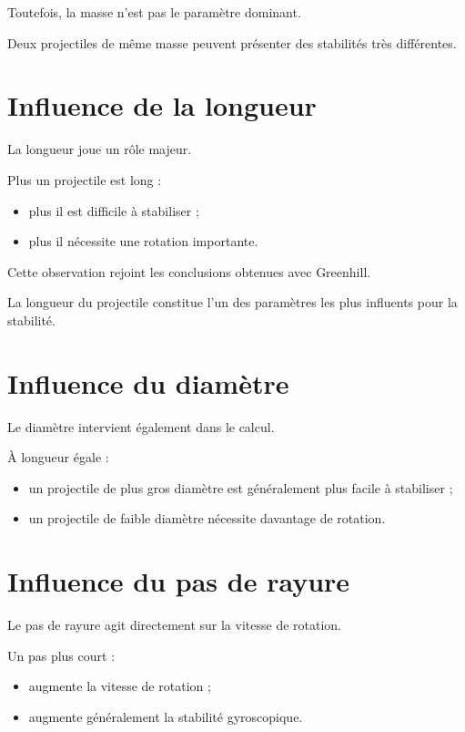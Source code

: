Toutefois, la masse n'est pas le paramètre dominant.

Deux projectiles de même masse peuvent présenter des stabilités très
différentes.

\section{Influence de la longueur}

La longueur joue un rôle majeur.

Plus un projectile est long :

\begin{itemize}
    \item plus il est difficile à stabiliser ;
    \item plus il nécessite une rotation importante.
\end{itemize}

Cette observation rejoint les conclusions obtenues avec Greenhill.

\begin{aretenir}

La longueur du projectile constitue l'un des paramètres les plus influents
pour la stabilité.

\end{aretenir}

\section{Influence du diamètre}

Le diamètre intervient également dans le calcul.

À longueur égale :

\begin{itemize}
    \item un projectile de plus gros diamètre est généralement plus facile à
          stabiliser ;
    \item un projectile de faible diamètre nécessite davantage de rotation.
\end{itemize}

\section{Influence du pas de rayure}

Le pas de rayure agit directement sur la vitesse de rotation.

Un pas plus court :

\begin{itemize}
    \item augmente la vitesse de rotation ;
    \item augmente généralement la stabilité gyroscopique.
\end{itemize}

